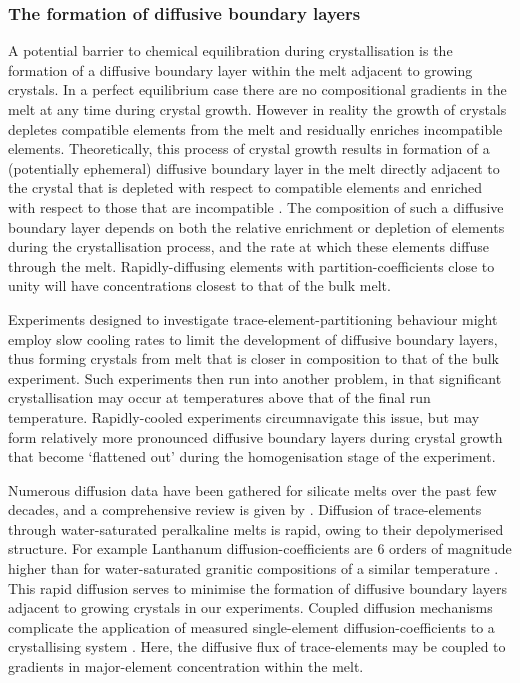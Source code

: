 \documentclass[final,authoryear,3p,times,twocolumn]{elsarticle}
\begin{document}
\subsubsection{The formation of diffusive boundary layers}
A potential barrier to chemical equilibration during crystallisation is the formation of a diffusive boundary layer within the melt adjacent to growing crystals. In a perfect equilibrium case there are no compositional gradients in the melt at any time during crystal growth. However in reality the growth of crystals depletes compatible elements from the melt and residually enriches incompatible elements. 
    Theoretically, this process of crystal growth results in formation of a (potentially ephemeral) diffusive boundary layer in the melt directly adjacent to the crystal that is depleted with respect to compatible elements and enriched with respect to those that are incompatible \citep{Lu1995}. The composition of such a diffusive boundary layer depends on both the relative enrichment or depletion of elements during the crystallisation process, and the rate at which these elements diffuse through the melt. Rapidly-diffusing elements with partition-coefficients close to unity will have concentrations closest to that of the bulk melt.

Experiments designed to investigate trace-element-partitioning behaviour might employ slow cooling rates to limit the development of diffusive boundary layers, thus forming crystals from melt that is closer in composition to that of the bulk experiment. Such experiments then run into another problem, in that significant crystallisation may occur at temperatures above that of the final run temperature. Rapidly-cooled experiments circumnavigate this issue, but may form relatively more pronounced diffusive boundary layers during crystal growth that become `flattened out' during the homogenisation stage of the experiment.

Numerous diffusion data have been gathered for silicate melts over the past few decades, and a comprehensive review is given by \citet{Zhang2010}. Diffusion of trace-elements through water-saturated peralkaline melts is rapid, owing to their depolymerised structure. For example Lanthanum diffusion-coefficients are 6 orders of magnitude higher than for water-saturated granitic compositions of a similar temperature \citep[compare][]{Rapp1986,Behrens2009}. This rapid diffusion serves to minimise the formation of diffusive boundary layers adjacent to growing crystals in our experiments.
Coupled diffusion mechanisms complicate the application of measured single-element diffusion-coefficients to a crystallising system \citep{Grove1984,Liang1994,Costa2003}. Here, the diffusive flux of trace-elements may be coupled to gradients in major-element concentration within the melt. 
\end{document}

